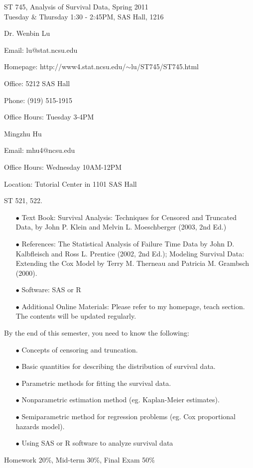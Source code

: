 \documentclass[12pt]{article}
\begin{document}
\renewcommand{\baselinestretch}{1.5}

\begin{center}
\large ST 745, Analysis of Survival Data, Spring 2011 \\
Tuesday $\&$ Thursday 1:30 - 2:45PM, SAS Hall, 1216
\end{center}

\bigskip
{} Dr. Wenbin Lu

\noindent Email: lu@stat.ncsu.edu

\noindent Homepage:
http://www4.stat.ncsu.edu/$\sim$lu/ST745/ST745.html

\noindent Office: 5212 SAS Hall

\noindent Phone: (919) 515-1915

\noindent Office Hours: Tuesday 3-4PM

\bigskip
{} Mingzhu Hu

\noindent Email: mhu4@ncsu.edu

\noindent Office Hours: Wednesday 10AM-12PM

\noindent Location: Tutorial Center in 1101 SAS Hall

\bigskip
{} ST 521, 522.

\bigskip
{}
\begin{enumerate}
\item[$\bullet$] Text Book: Survival Analysis: Techniques for
Censored and Truncated Data, by John P. Klein and Melvin L.
Moeschberger (2003, 2nd Ed.)
\item[$\bullet$] References: The Statistical Analysis of Failure Time Data by John D.
Kalbfleisch and Ross L. Prentice (2002, 2nd Ed.); Modeling
Survival Data: Extending the Cox Model by Terry M. Therneau and
Patricia M. Grambsch (2000).
\item[$\bullet$] Software: SAS or R
\item[$\bullet$] Additional Online Materials: Please refer to my
homepage, teach section. The contents will be updated regularly.
\end{enumerate}

\medskip
{} By the end of this semester,
you need to know the following:
\begin{enumerate}
\item[$\bullet$] Concepts of censoring and truncation.
\item[$\bullet$] Basic quantities for describing the distribution of survival data.
\item[$\bullet$] Parametric methods for fitting the survival data.
\item[$\bullet$] Nonparametric estimation method (eg. Kaplan-Meier estimates).
\item[$\bullet$] Semiparametric method for regression problems (eg. Cox proportional hazards model).
\item[$\bullet$] Using SAS or R software to analyze survival data
\end{enumerate}

\medskip

 Homework 20\%, Mid-term 30\%, Final Exam
50\%
\end{document}
